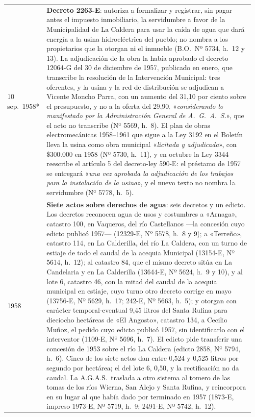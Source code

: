 \begin{longtable}{@{}p{2.7cm}p{10.3cm}@{}}
10 sep.\ 1958* & \textbf{Decreto 2263-E}: autoriza a formalizar y registrar, sin pagar antes el impuesto inmobiliario, la servidumbre a favor de la Municipalidad de La Caldera para usar la caída de agua que dará energía a la usina hidroeléctrica del pueblo; no nombra a los propietarios que la otorgan ni el inmueble (B.O.\ Nº 5734, h.\ 12 y 13). La adjudicación de la obra la había aprobado el decreto 12064-G del 30 de diciembre de 1957, publicado en enero, que transcribe la resolución de la Intervención Municipal: tres oferentes, y la usina y la red de distribución se adjudican a Vicente Moncho Parra, con un aumento del 31,10 por ciento sobre el presupuesto, y no a la oferta del 29,90, «\textit{considerando lo manifestado por la Administración General de A.\ G.\ A.\ S.}», que el acto no transcribe (Nº 5569, h.\ 8). El plan de obras electromecánicas 1958--1961 que sigue a la Ley 3192 en el Boletín lleva la usina como obra municipal «\textit{licitada y adjudicada}», con \$300.000 en 1958 (Nº 5730, h.\ 11), y en octubre la Ley 3344 reescribe el artículo 5 del decreto-ley 590-E: el préstamo de 1957 se entregará «\textit{una vez aprobada la adjudicación de los trabajos para la instalación de la usina}», y el nuevo texto no nombra la servidumbre (Nº 5778, h.\ 5). \\
1958 & \textbf{Siete actos sobre derechos de agua}: seis decretos y un edicto. Los decretos reconocen agua de usos y costumbres a «Arnaga», catastro 100, en Vaqueros, del río Castellanos ---la concesión cuyo edicto publicó 1957--- (12329-E, Nº 5578, h.\ 8 y 9); a «Terreño», catastro 114, en La Calderilla, del río La Caldera, con un turno de estiaje de todo el caudal de la acequia Municipal (13154-E, Nº 5614, h.\ 12); al catastro 84, que el mismo decreto sitúa en La Candelaria y en La Calderilla (13644-E, Nº 5624, h.\ 9 y 10), y al lote 6, catastro 46, con la mitad del caudal de la acequia municipal en estiaje, cuyo turno otro decreto corrige en mayo (13756-E, Nº 5629, h.\ 17; 242-E, Nº 5663, h.\ 5); y otorgan con carácter temporal-eventual 9,45 litros del Santa Rufina para dieciocho hectáreas de «El Angosto», catastro 134, a Cecilio Muñoz, el pedido cuyo edicto publicó 1957, sin identificarlo con el interventor (1109-E, Nº 5696, h.\ 7). El edicto pide transferir una concesión de 1953 sobre el río La Caldera (edicto 2858, Nº 5794, h.\ 6). Cinco de los siete actos dan entre 0,524 y 0,525 litros por segundo por hectárea; el del lote 6, 0,50, y la rectificación no da caudal. La A.G.A.S.\ traslada a otro sistema al tomero de las tomas de los ríos Wierna, San Alejo y Santa Rufina, y reincorpora en su lugar al que había dado por terminado en 1957 (1873-E, impreso 1973-E, Nº 5719, h.\ 9; 2491-E, Nº 5742, h.\ 12). \\

\end{longtable}
